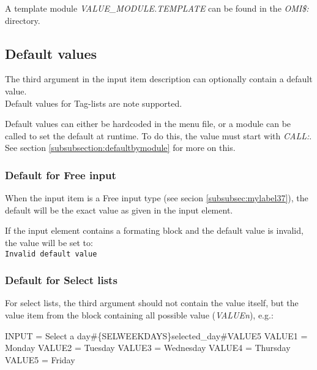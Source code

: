 \documentclass[a4paper]{book}
\newcommand{\vs}{\vspace{3mm}}
\renewcommand{\indent}{\hspace*{5mm}}
\begin{document}
\vs

A template module \textsl{VALUE{\_}MODULE.TEMPLATE} can be found in the \textsl{OMI{\$}:} directory.

\subsection{Default values}\label{subsubsec:defaults}

The third argument in the input item description can optionally contain a default value.\\
Default values for Tag-lists are note supported.

\vs

Default values can either be hardcoded in the menu file, or a module can be called to set the default at runtime.
To do this, the value must start with \textsl{CALL:}.\\
See section \ref{subsubsection:defaultbymodule} for more on this.

\subsubsection{Default for Free input}
When the input item is a Free input type (see secion \ref{subsubsec:mylabel37}), the default will be the exact
value as given in the input element.

If the input element contains a formating block and the default value is invalid, the value will be set to:\\
\texttt{Invalid default value}

\subsubsection{Default for Select lists}\label{subsubsection:defaultforselectlist}

For select lists, the third argument should not contain the value itself, but the value item from the block containing
all possible value (\textsl{VALUE\textit{n}}), e.g.:

\begin{ttfamily}
\indent INPUT = Select a day{\#}{\{}SEL\textbar WEEKDAYS{\}}selected{\_}day{\#}VALUE5\newline
\noindent[WEEKDAYS] \newline
\indent VALUE1 = Monday \newline
\indent VALUE2 = Tuesday \newline
\indent VALUE3 = Wednesday \newline
\indent VALUE4 = Thursday \newline
\indent VALUE5 = Friday \newline
\end{ttfamily}
\end{document}
